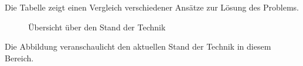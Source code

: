 Die Tabelle zeigt einen Vergleich verschiedener Ansätze zur Lösung des Problems.

\begin{figure}[htbp]
\centering
\caption{Übersicht über den Stand der Technik}
\label{fig:stand-der-technik}
\end{figure}

Die Abbildung veranschaulicht den aktuellen Stand der Technik in diesem Bereich.

